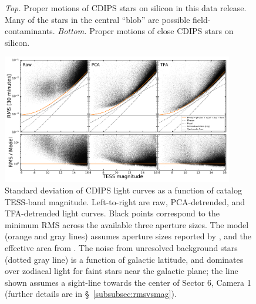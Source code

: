 \documentclass[12pt,twocolumn,tighten]{aastex62}
\begin{document}
\begin{figure}[!t]
	\vspace{-0.9cm}
	\vspace{-0.9cm}
	\caption{
		{\it Top.} Proper motions of CDIPS stars on silicon in this
		data release.  Many of the stars in the central ``blob'' are possible
		field-contaminants.
		{\it Bottom.} Proper motions of close CDIPS stars
		on silicon.
	}
	\label{fig:propermotions}
\end{figure}

\begin{figure}[!t]
	\begin{center}
		\leavevmode
		\includegraphics[width=0.9\textwidth]{IRM-PCA-TFA_rms_vs_mag.pdf}
	\end{center}
	\vspace{-0.7cm}
	\caption{
    Standard deviation of CDIPS light curves as a function of catalog
    TESS-band magnitude.  Left-to-right are raw, PCA-detrended, and
    TFA-detrended light curves. Black points correspond to the minimum
    RMS across the available three aperture sizes.  The model (orange
    and gray lines) assumes aperture sizes reported by
    \citet{Sullivan_et_al_2015}, and the effective area from
    \citet{vanderspek_2018}.  The noise from unresolved background
    stars (dotted gray line) is a function of galactic latitude, and
    dominates over zodiacal light for faint stars near the galactic
    plane; the line shown assumes a sight-line towards the center of
    Sector 6, Camera 1 (further details are in
    \S~\ref{subsubsec:rmsvsmag}).
		\label{fig:rms_vs_mag}
	}
\end{figure}
\end{document}
